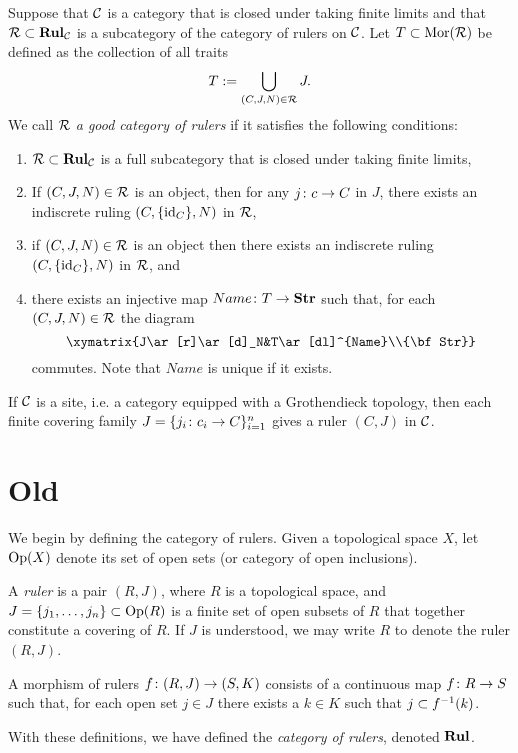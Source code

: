 \documentclass{amsart}
\def\Rul{{\bf Rul}}
\def\Str{{\bf Str}}
\def\Mor{{\rm Mor}}
\begin{document}
\begin{definition}

Suppose that $\mathcal{C}$ is a category that is closed under taking finite limits and that $\mcR\ss\Rul_\mcC$ is a subcategory of the category of rulers on $\mathcal{C}$.  Let $T\ss\Mor(\mcR)$ be defined as the collection of all traits $$T:=\bigcup_{(C,J,N)\in\mathcal{R}}J.$$  We call $\mathcal{R}$ {\em a good category of rulers} if it satisfies the following conditions:\begin{enumerate}\item $\mcR\ss\Rul_\mcC$ is a full subcategory that is closed under taking finite limits,\item If $(C,J,N)\in\mathcal{R}$ is an object, then for any $j\colon c\rightarrow C$ in $J$, there exists an indiscrete ruling $(C,\{\textnormal{id}_C\},N)$  in $\mathcal{R}$, \item if $(C,J,N)\in\mathcal{R}$ is an object then there exists an indiscrete ruling $(C,\{\textnormal{id}_C\},N)$ in $\mathcal{R}$, and \item there exists an injective map $Name\colon T\to\Str$ such that, for each $(C,J,N)\in\mathcal{R}$ the diagram $$\xymatrix{J\ar[r]\ar[d]_N&T\ar[dl]^{Name}\\\Str}$$ commutes.  Note that $Name$ is unique if it exists.\end{enumerate}

\end{definition}

\begin{example}

If $\mathcal{C}$ is a site, i.e. a category equipped with a Grothendieck topology, then each finite covering family $J=\{j_i\colon c_i\rightarrow C\}_{i=1}^n$ gives a ruler $(C,J)$ in $\mathcal{C}$.

\end{example}

\section{Old}

We begin by defining the category of rulers.  Given a topological space $X$, let $\textnormal{Op}(X)$ denote its set of open sets (or category of open inclusions).

\begin{definition}

A {\em ruler} is a pair $(R,J)$, where $R$ is a topological space, and $J=\{j_1,\ldots,j_n\}\subset\textnormal{Op}(R)$ is a finite set of open subsets of $R$ that together constitute a covering of $R$.  If $J$ is understood, we may write $R$ to denote the ruler $(R,J)$.

A morphism of rulers $f\colon (R,J)\rightarrow(S,K)$ consists of a continuous map $f\colon R\rightarrow S$ such that, for each open set $j\in J$ there exists a $k\in K$ such that $j\ss f^\m1(k)$.

With these definitions, we have defined the {\em category of rulers}, denoted $\Rul$.

\end{definition}
\end{document}
